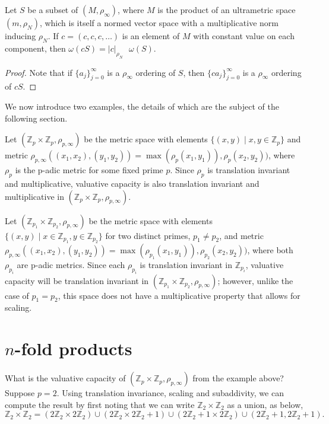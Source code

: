 \begin{corollary}
Let $S$ be a subset of $(M, \rho_\infty)$, where $M$ is the product of an ultrametric space $(m, \rho_N)$, which is itself a normed vector space with a multiplicative norm inducing $\rho_N$. If $c=(c,c,c,\ldots)$ is an element of $M$ with constant value on each component, then $\omega(cS)=\lvert c \rvert_{\rho_N} \text{ }\omega(S)$.
\end{corollary}

\begin{proof} 
Note that if $\{a_j\}_{j=0}^\infty$ is a $\rho_\infty$ ordering of $S$, then $\{ca_j\}_{j=0}^\infty$ is a $\rho_\infty$ ordering of $cS$.
\end{proof}

We now introduce two examples, the details of which are the subject of the following section. 

\begin{example}
	Let $(\mathbb{Z}_p \times \mathbb{Z}_p, \rho_{p,\infty})$ be the metric space with elements $\{(x,y)\mid x,y \in \mathbb{Z}_p\}$ and metric $\rho_{p,\infty}((x_1,x_2), (y_1,y_2)) = \max(\rho_p(x_1, y_1)), \rho_p(x_2, y_2))$, where $\rho_p$ is the p-adic metric for some fixed prime $p$. Since $\rho_p$ is translation invariant and multiplicative, valuative capacity is also translation invariant and multiplicative in  $(\mathbb{Z}_p \times \mathbb{Z}_p, \rho_{p,\infty})$.
\end{example}

\begin{example}
	Let $(\mathbb{Z}_{p_1} \times \mathbb{Z}_{p_2}, \rho_{p,\infty})$ be the metric space with elements $\{(x,y)\mid x \in \mathbb{Z}_{p_1}, y \in \mathbb{Z}_{p_2}\}$ for two distinct primes, $p_1 \neq p_2$, and metric $\rho_{p,\infty}((x_1,x_2), (y_1,y_2)) = \max(\rho_{p_1}(x_1, y_1)), \rho_{p_2}(x_2, y_2))$, where both $\rho_{p_i}$ are p-adic metrics. Since each $\rho_{p_i}$ is translation invariant in $\mathbb{Z}_{p_i}$, valuative capacity will be translation invariant  in  $(\mathbb{Z}_{p_1} \times \mathbb{Z}_{p_2}, \rho_{p,\infty})$; however, unlike the case of $p_1=p_2$, this space does not have a multiplicative property that allows for scaling.
\end{example}


\section*{ \textbf{$n$-fold products}}
What is the valuative capacity of  $(\mathbb{Z}_p \times \mathbb{Z}_p, \rho_{p,\infty})$  from the example above? Suppose $p=2$.  Using translation invariance, scaling and subaddivity, we can compute the result by first noting that we can write $\mathbb{Z}_2 \times \mathbb{Z}_2$ as a union, as below,
\[
\mathbb{Z}_2 \times \mathbb{Z}_2 = (2\mathbb{Z}_2 \times 2\mathbb{Z}_2) \cup (2\mathbb{Z}_2 \times 2\mathbb{Z}_2 +1) \cup (2\mathbb{Z}_2+1 \times 2\mathbb{Z}_2) \cup (2\mathbb{Z}_2+1, 2\mathbb{Z}_2+1).
\]

